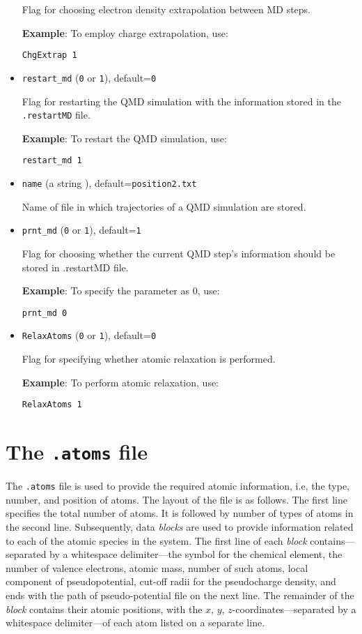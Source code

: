 \documentclass[12pt]{report}
\begin{document}
\begin{itemize}
Flag for choosing electron density extrapolation between MD steps.
 
{\bf{Example}}: To employ charge extrapolation, use: 

\texttt{ChgExtrap 1}

\item\texttt{restart\_md} {(\texttt{0} or \texttt{1})}, default=\texttt{0}

Flag for restarting the QMD simulation with the information stored in the \texttt{.restartMD} file.
 
{\bf{Example}}: To restart the QMD simulation, use: 

\texttt{restart\_md 1}

\item\texttt{name} {(a string )}, default=\texttt{position2.txt}

Name of file in which trajectories of a QMD simulation are stored.

\item\texttt{prnt\_md} (\texttt{0} or \texttt{1}), default=\texttt{1}

Flag for choosing whether the current QMD step's information should be stored in .restartMD file. 

{\bf{Example}}: To specify the parameter as $0$, use: 

\texttt{prnt\_md 0}

\item\texttt{RelaxAtoms} (\texttt{0} or \texttt{1}), default=\texttt{0}

Flag for specifying whether atomic relaxation is performed.
 
{\bf{Example}}: To perform atomic relaxation, use: 

\texttt{RelaxAtoms 1}

\end{itemize}


\section{The \texttt{.atoms} file}\label{section:ion}
The \texttt{.atoms} file is used to provide the required atomic information, i.e, the type, number, and position of atoms. The layout of the file is as follows. The first line specifies the total number of atoms. It is followed by number of types of atoms in the second line. Subsequently, data \emph{blocks} are used to provide information related to each of the atomic species in the system. The first line of each \emph{block} contains---separated by a whitespace delimiter---the symbol for the chemical element, the number of valence electrons, atomic mass, number of such atoms, local component of pseudopotential, cut-off radii for the pseudocharge density, and ends with the path of pseudo-potential file on the next line. The remainder of the \emph{block} contains their atomic positions, with the $x$, $y$, $z$-coordinates---separated by a whitespace delimiter---of each atom listed on a separate line. \vspace{3mm}
\end{document}
